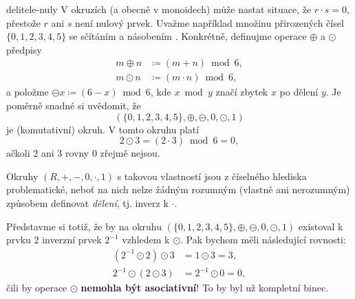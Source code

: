 \begin{warning}{}{delitele-nuly}
 V okruzích (a obecně v monoidech) může nastat situace, že $r \cdot s = 0$,
 přestože $r$ ani $s$ není nulový prvek. Uvažme například množinu přirozených
 čísel $\{0,1,2,3,4,5\}$ se sčítáním a násobením . Konkrétně,
 definujme operace $ \oplus $ a $\odot$ předpisy
 \begin{align*}
  m \oplus n &\coloneqq (m + n) \bmod 6,\\
  m \odot n & \coloneqq (m \cdot n) \bmod 6,
 \end{align*}
 a položme $\ominus x \coloneqq (6-x) \bmod 6$, kde $x \bmod y$ značí zbytek $x$
 po dělení $y$. Je poměrně snadné si uvědomit, že
 \[
  (\{0,1,2,3,4,5\}, \oplus ,\ominus, 0, \odot, 1)
 \]
 je (komutativní) okruh. V tomto okruhu platí
 \[
  2 \odot 3 = (2 \cdot 3) \bmod 6 = 0,
 \]
 ačkoli $2$ ani $3$ rovny $0$ zřejmě nejsou.

 Okruhy $(R,+,-,0, \cdot ,1)$  s takovou vlastností jsou z číselného hlediska
 problematické, neboť na nich nelze žádným rozumným (vlastně ani nerozumným)
 způsobem definovat \emph{dělení}, tj. inverz k $\cdot$.

 Představme si totiž, že by na okruhu $(\{0,1,2,3,4,5\}, \oplus ,\ominus, 0,
 \odot, 1)$ existoval k prvku $2$ inverzní prvek $2^{-1}$ vzhledem k $\odot$.
 Pak bychom měli následující rovnosti:
 \begin{align*}
  (2^{-1} \odot 2) \odot 3 &= 1 \odot 3 = 3,\\
  2^{-1} \odot (2 \odot 3) &= 2^{-1} \odot 0 = 0,
 \end{align*}
 čili by operace $\odot$ \textbf{nemohla být asociativní}! To by byl už
 kompletní binec.
\end{warning}
